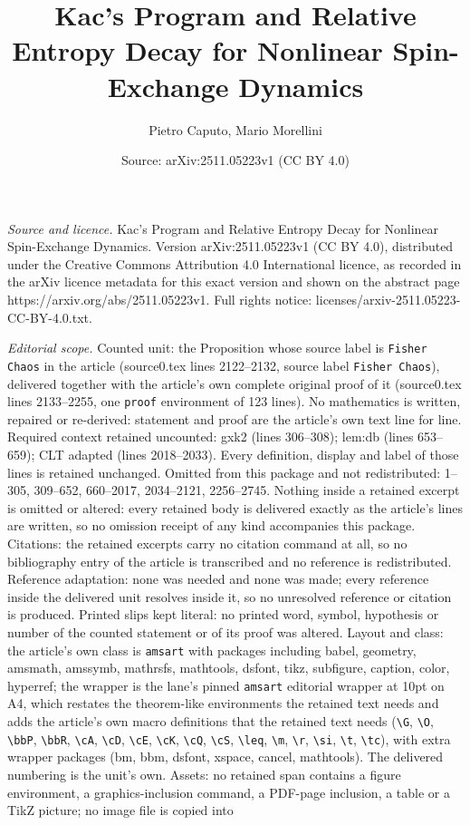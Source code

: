 \documentclass[10pt,a4paper]{amsart}
\title[Kac's Program and Relative Entropy Decay for Nonlinear Spin-]{Kac's Program and Relative Entropy Decay for Nonlinear Spin-Exchange Dynamics}
\author{Pietro Caputo, Mario Morellini}
\date{Source: arXiv:2511.05223v1 (CC BY 4.0)}
\begin{document}
\maketitle

\noindent\emph{Source and licence.} Kac's Program and Relative Entropy Decay for Nonlinear Spin-Exchange Dynamics. Version arXiv:2511.05223v1 (CC BY 4.0), distributed under the Creative Commons Attribution 4.0 International licence, as recorded in the arXiv licence metadata for this exact version and shown on the abstract page https://arxiv.org/abs/2511.05223v1. Full rights notice: licenses/arxiv-2511.05223-CC-BY-4.0.txt.\par\smallskip

\noindent\textit{Editorial scope.} Counted unit: the Proposition whose source label is \texttt{Fisher Chaos} in the article (source0.tex lines 2122--2132, source label \texttt{Fisher Chaos}), delivered together with the article's own complete original proof of it (source0.tex lines 2133--2255, one \texttt{proof} environment of 123 lines). No mathematics is written, repaired or re-derived: statement and proof are the article's own text line for line. Required context retained uncounted: gxk2 (lines 306--308); lem:db (lines 653--659); CLT adapted (lines 2018--2033). Every definition, display and label of those lines is retained unchanged. Omitted from this package and not redistributed: 1--305, 309--652, 660--2017, 2034--2121, 2256--2745. Nothing inside a retained excerpt is omitted or altered: every retained body is delivered exactly as the article's lines are written, so no omission receipt of any kind accompanies this package. Citations: the retained excerpts carry no citation command at all, so no bibliography entry of the article is transcribed and no reference is redistributed. Reference adaptation: none was needed and none was made; every reference inside the delivered unit resolves inside it, so no unresolved reference or citation is produced. Printed slips kept literal: no printed word, symbol, hypothesis or number of the counted statement or of its proof was altered. Layout and class: the article's own class is \texttt{amsart} with packages including babel, geometry, amsmath, amssymb, mathrsfs, mathtools, dsfont, tikz, subfigure, caption, color, hyperref; the wrapper is the lane's pinned \texttt{amsart} editorial wrapper at 10pt on A4, which restates the theorem-like environments the retained text needs and adds the article's own macro definitions that the retained text needs (\texttt{\textbackslash G}, \texttt{\textbackslash O}, \texttt{\textbackslash bbP}, \texttt{\textbackslash bbR}, \texttt{\textbackslash cA}, \texttt{\textbackslash cD}, \texttt{\textbackslash cE}, \texttt{\textbackslash cK}, \texttt{\textbackslash cQ}, \texttt{\textbackslash cS}, \texttt{\textbackslash leq}, \texttt{\textbackslash m}, \texttt{\textbackslash r}, \texttt{\textbackslash si}, \texttt{\textbackslash t}, \texttt{\textbackslash tc}), with extra wrapper packages (bm, bbm, dsfont, xspace, cancel, mathtools). The delivered numbering is the unit's own. Assets: no retained span contains a figure environment, a graphics-inclusion command, a PDF-page inclusion, a table or a TikZ picture; no image file is copied into 
\end{document}
